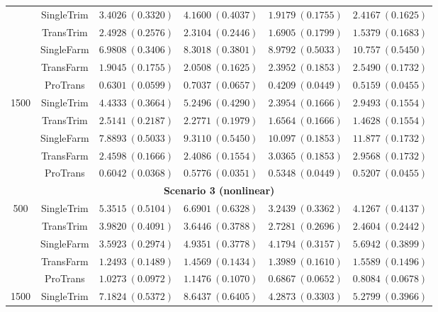 \documentclass[12pt]{article}
\begin{document}
\begin{table}[!ht]
\begin{tabular}{cccccc}
        & SingleTrim   & $3.4026\ (0.3320)$ & $4.1600\ (0.4037)$ & $1.9179\ (0.1755)$ & $2.4167\ (0.1625)$\\
        & TransTrim   & $2.4928\ (0.2576)$ & $2.3104\ (0.2446)$ & $1.6905\ (0.1799)$ & $1.5379\ (0.1683)$\\
        & SingleFarm   & $6.9808\ (0.3406)$ & $8.3018\ (0.3801)$ & $8.9792\ (0.5033)$ & $10.757\ (0.5450)$\\
        & TransFarm   & $1.9045\ (0.1755)$ & $2.0508\ (0.1625)$ & $2.3952\ (0.1853)$ & $2.5490\ (0.1732)$\\
        & ProTrans   & $\bm{0.6301}\ (0.0599)$ & $\bm{0.7037}\ (0.0657)$ & $\bm{0.4209}\ (0.0449)$ & $\bm{0.5159}\ (0.0455)$\\
        \hline
        \multirow{5}{*}{1500} 
        & SingleTrim & $4.4333\ (0.3664)$ & $5.2496\ (0.4290)$ & $2.3954\ (0.1666)$ & $2.9493\ (0.1554)$\\
        & TransTrim  & $2.5141\ (0.2187)$ & $2.2771\ (0.1979)$ & $1.6564\ (0.1666)$ & $1.4628\ (0.1554)$ \\
        & SingleFarm  & $7.8893\ (0.5033)$ & $9.3110\ (0.5450)$ & $10.097\ (0.1853)$ & $11.877\ (0.1732)$ \\
        & TransFarm   & $2.4598\ (0.1666)$ & $2.4086\ (0.1554)$ & $3.0365\ (0.1853)$ & $2.9568\ (0.1732)$\\
        & ProTrans  & $\bm{0.6042}\ (0.0368)$ & $\bm{0.5776}\ (0.0351)$ & $\bm{0.5348}\ (0.0449)$ & $\bm{0.5207}\ (0.0455)$ \\
                \hline
         \multicolumn{6}{c}{\textbf{Scenario 3 (nonlinear)}}\\
         \hline
         \multirow{5}{*}{500} 
        & SingleTrim & $5.3515\ (0.5104)$  & $6.6901\ (0.6328)$ & $3.2439\ (0.3362)$ & $4.1267\ (0.4137)$ \\
        & TransTrim   & $3.9820\ (0.4091)$  & $3.6446\ (0.3788)$ & $2.7281\ (0.2696)$ & $2.4604\ (0.2442)$ \\
        & SingleFarm  & $3.5923\ (0.2974)$  & $4.9351\ (0.3778)$  & $4.1794\ (0.3157)$  & $5.6942\ (0.3899)$ \\
        & TransFarm  & $1.2493\ (0.1489)$ & $1.4569\ (0.1434)$ & $1.3989\ (0.1610)$  & $1.5589\ (0.1496)$ \\
        & ProTrans    & $\bm{1.0273}\ (0.0972)$  & $\bm{1.1476}\ (0.1070)$  & $\bm{0.6867}\ (0.0652)$ & $\bm{0.8084}\ (0.0678)$ \\
        \hline
        \multirow{5}{*}{1500} 
        & SingleTrim  & $7.1824\ (0.5372)$ & $8.6437\ (0.6405)$ & $4.2873\ (0.3303)$ & $5.2799\ (0.3966)$ \\

\end{tabular}
\end{table}
\end{document}
